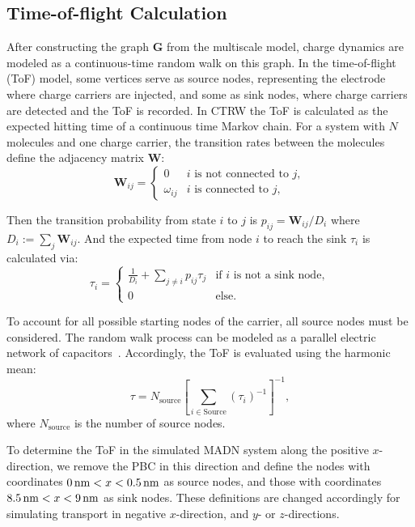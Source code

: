 \documentclass[%
 reprint,
superscriptaddress,
 amsmath,amssymb,
 aps,
prb,
floatfix
]{revtex4-2}
\begin{document}
\subsection{Time-of-flight Calculation}
After constructing the  graph $\mathbf{G}$ from the multiscale model, charge dynamics are modeled as a continuous-time random walk on this graph. In the time-of-flight (ToF) model, some vertices serve as source nodes, representing the electrode where charge carriers are injected, and some as sink nodes, where charge carriers are detected and the ToF is recorded. In CTRW the ToF is calculated as the expected hitting time of a continuous time Markov chain. For a system with $N$ molecules and one charge carrier, the transition rates between the molecules define the adjacency matrix $\mathbf{W}$:
%
\begin{equation}
  \label{eq:transition_rates}
	\mathbf{W}_{ij} =
	\begin{cases}
	     0			&  i \text{ is not connected to } j,\\
         \omega_{ij}   &  i \text{ is connected to } j,
	\end{cases}
\end{equation}

Then the transition probability from state $i$ to $j$ is $p_{ij} = \mathbf{W}_{ij}/D_i$ where $D_i := \sum_{j} \mathbf{W}_{ij}$.
And the expected time from node $i$ to reach the sink $\tau_i$ is calculated via: 
%
\begin{equation}
  \label{eq:hitting_time}
	\tau_i = \begin{cases}
		\frac{1}{D_i} + \sum_{j \ne i} p_{ij} \tau_{j} &\text{if $i$ is not a sink node},\\
		0 &\text{else.} 
	\end{cases}
\end{equation} 

To account for all possible starting nodes of the carrier, all source nodes must be considered. The random walk process can be modeled as a parallel electric network of capacitors~\cite{doyle_random_1984}. Accordingly, the ToF is evaluated using the harmonic mean:
%
\begin{equation} 
  \tau = N_\text{source} \left[\sum_{i \in \text{Source}} (\tau_i)^{-1}\right]^{-1},
  \label{eq:ToF}
\end{equation}
%
where $N_\text{source}$ is the number of source nodes.

To determine the ToF in the simulated MADN system along the positive $x$-direction, we remove the PBC in this direction and define the nodes with coordinates $\unit[0]{nm} < x < \unit[0.5]{nm}$ as source nodes, and those with coordinates $\unit[8.5]{nm} < x < \unit[9]{nm}$ as sink nodes. These definitions are changed accordingly for simulating transport in negative $x$-direction, and $y$- or $z$-directions.
\end{document}
